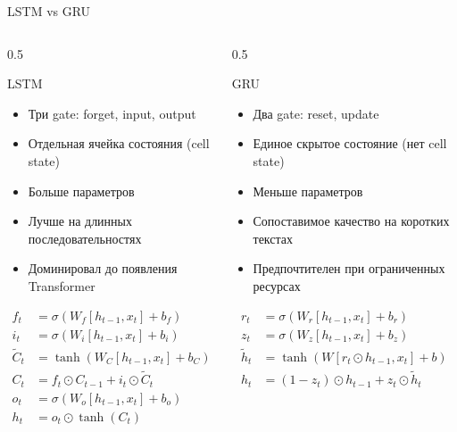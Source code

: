 \documentclass[aspectratio=169, 9pt]{beamer}
\begin{document}
\begin{frame}{LSTM vs GRU}
  \begin{columns}[T]
    \begin{column}{0.5\textwidth}
      \begin{block}{LSTM}
        \begin{itemize}
          \item Три gate: forget, input, output
          \item Отдельная ячейка состояния (cell state)
          \item Больше параметров
          \item Лучше на длинных последовательностях
          \item Доминировал до появления Transformer
        \end{itemize}
      \end{block}
      
      \[
      \begin{aligned}
      f_t &= \sigma(W_f [h_{t-1}, x_t] + b_f) \\
      i_t &= \sigma(W_i [h_{t-1}, x_t] + b_i) \\
      \tilde{C}_t &= \tanh(W_C [h_{t-1}, x_t] + b_C) \\
      C_t &= f_t \odot C_{t-1} + i_t \odot \tilde{C}_t \\
      o_t &= \sigma(W_o [h_{t-1}, x_t] + b_o) \\
      h_t &= o_t \odot \tanh(C_t)
      \end{aligned}
      \]
    \end{column}
    \begin{column}{0.5\textwidth}
      \begin{block}{GRU}
        \begin{itemize}
          \item Два gate: reset, update
          \item Единое скрытое состояние (нет cell state)
          \item Меньше параметров
          \item Сопоставимое качество на коротких текстах
          \item Предпочтителен при ограниченных ресурсах
        \end{itemize}
      \end{block}
      
      \[
      \begin{aligned}
      r_t &= \sigma(W_r [h_{t-1}, x_t] + b_r) \\
      z_t &= \sigma(W_z [h_{t-1}, x_t] + b_z) \\
      \tilde{h}_t &= \tanh(W [r_t \odot h_{t-1}, x_t] + b) \\
      h_t &= (1-z_t) \odot h_{t-1} + z_t \odot \tilde{h}_t
      \end{aligned}
      \]
    \end{column}
  \end{columns}
\end{frame}
\end{document}
